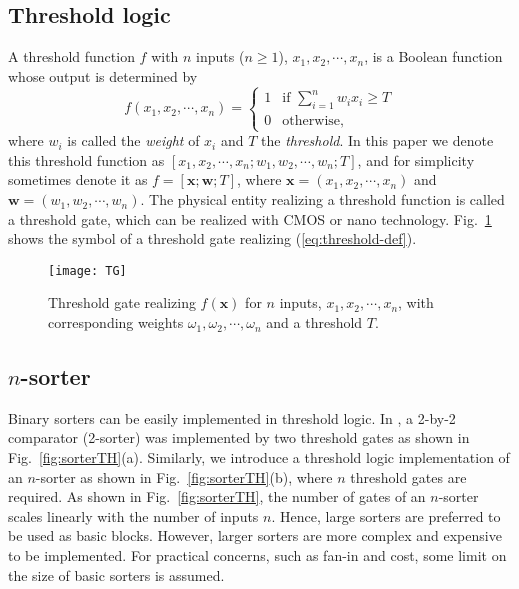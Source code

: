\documentclass[10pt,journal,cspaper,compsoc]{IEEEtran}
\newcommand{\mb}[1]{\ensuremath{\mathbf{#1}}}
\def\mb{\mathbf}
\begin{document}
\subsection{Threshold logic}
A threshold function \cite{Mur71} $f$ with $n$ inputs ($n\ge 1$), $x_1, x_2, \cdots, x_n$, is a Boolean function whose output is determined by
\begin{equation}
  f(x_1, x_2, \cdots, x_n) = \left\{ \begin{array}{cl} 1 & \mbox{if } \sum_{i=1}^n  w_ix_i \ge T \\
  0 & \mbox{otherwise,} \end{array} \right.
\label{eq:threshold-def}
\end{equation}
where $w_i$ is called the {\em weight} of $x_i$ and $T$ the {\em threshold}. In this paper we denote this threshold function as $[x_1, x_2, \cdots, x_n; w_1, w_2, \cdots, w_n; T]$, and for simplicity sometimes denote it as $f=[\mathbf{x};\mathbf{w};T]$, where  $\mb{x}=(x_1, x_2, \cdots, x_n)$ and $\mb{w}=(w_1, w_2, \cdots, w_n)$. The physical entity realizing a threshold function is called a threshold gate, which can be realized with CMOS or nano technology. Fig.~\ref{fig:TG} shows the symbol of a threshold gate realizing (\ref{eq:threshold-def}).

\begin{figure}[!h]
\centering
\texttt{[image: TG]}
\caption{Threshold gate realizing $f(\mathbf{x})$ for $n$ inputs, $x_1, x_2, \cdots , x_n$, with corresponding weights $\omega_1, \omega_2, \cdots, \omega_n$ and a threshold $T$.}
\label{fig:TG}
\end{figure}

\subsection{$n$-sorter}
Binary sorters can be easily implemented in threshold logic. In \cite{Beiu1993enhanced}, a 2-by-2 comparator (2-sorter) was implemented by two threshold gates as shown in Fig.~\ref{fig:sorterTH}(a). Similarly, we introduce a threshold logic implementation of an $n$-sorter as shown in Fig.~\ref{fig:sorterTH}(b), where $n$ threshold gates are required. As shown in Fig.~\ref{fig:sorterTH}, the number of gates of an $n$-sorter scales linearly with the number of inputs $n$.
Hence, large sorters are preferred to be used as basic blocks. However, larger sorters are more complex and expensive to be implemented.
For practical concerns, such as fan-in and cost, some limit on the size of basic sorters is assumed.
\end{document}
